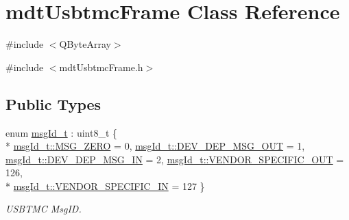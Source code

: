 \hypertarget{classmdt_usbtmc_frame}{\section{mdt\-Usbtmc\-Frame Class Reference}
\label{classmdt_usbtmc_frame}
}


\#include $<$\-Q\-Byte\-Array$>$  




{\ttfamily \#include $<$mdt\-Usbtmc\-Frame.\-h$>$}

\subsection*{Public Types}
\begin{DoxyCompactItemize}
\item 
enum \hyperlink{classmdt_usbtmc_frame_abf1e449c264011341c477d45eb700c42}{msg\-Id\-\_\-t} \-: uint8\-\_\-t \{ \\*
\hyperlink{classmdt_usbtmc_frame_abf1e449c264011341c477d45eb700c42adfdbe73c3e263c80155e377250eceebd}{msg\-Id\-\_\-t\-::\-M\-S\-G\-\_\-\-Z\-E\-R\-O} = 0, 
\hyperlink{classmdt_usbtmc_frame_abf1e449c264011341c477d45eb700c42a1886876c21b4748a4d4fb1756e6cb8fa}{msg\-Id\-\_\-t\-::\-D\-E\-V\-\_\-\-D\-E\-P\-\_\-\-M\-S\-G\-\_\-\-O\-U\-T} = 1, 
\hyperlink{classmdt_usbtmc_frame_abf1e449c264011341c477d45eb700c42a1238d82a486a9d6324ace1d5c60a92bd}{msg\-Id\-\_\-t\-::\-D\-E\-V\-\_\-\-D\-E\-P\-\_\-\-M\-S\-G\-\_\-\-I\-N} = 2, 
\hyperlink{classmdt_usbtmc_frame_abf1e449c264011341c477d45eb700c42ab2a33799ba113bf457f1112d3f685662}{msg\-Id\-\_\-t\-::\-V\-E\-N\-D\-O\-R\-\_\-\-S\-P\-E\-C\-I\-F\-I\-C\-\_\-\-O\-U\-T} = 126, 
\\*
\hyperlink{classmdt_usbtmc_frame_abf1e449c264011341c477d45eb700c42ad9f728364c29a2fef0432b273f9d03a4}{msg\-Id\-\_\-t\-::\-V\-E\-N\-D\-O\-R\-\_\-\-S\-P\-E\-C\-I\-F\-I\-C\-\_\-\-I\-N} = 127
 \}
\begin{DoxyCompactList}\small\item\em U\-S\-B\-T\-M\-C Msg\-I\-D. \end{DoxyCompactList}\end{DoxyCompactItemize}
